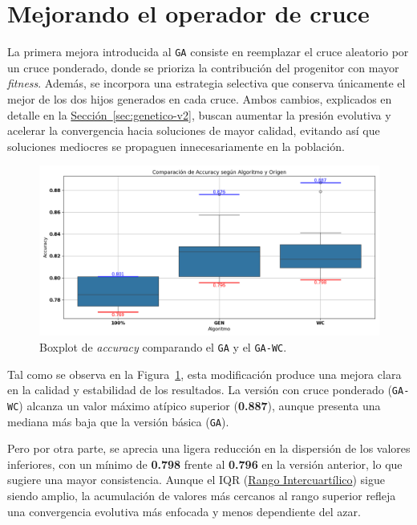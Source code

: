 \section{Mejorando el operador de cruce}\label{sec:incorporacion-cruce}
La primera mejora introducida al \texttt{GA} consiste en reemplazar el cruce aleatorio por un cruce ponderado,
donde se prioriza la contribución del progenitor con mayor \textit{fitness}.
Además, se incorpora una estrategia selectiva que conserva únicamente el mejor de los dos hijos generados en cada cruce.
Ambos cambios, explicados en detalle en la \hyperref[sec:genetico-v2]{Sección~\ref*{sec:genetico-v2}},
buscan aumentar la presión evolutiva y acelerar la convergencia hacia soluciones de mayor calidad,
evitando así que soluciones mediocres se propaguen innecesariamente en la población.

\begin{figure}[htp]
    \centering
    \includegraphics[width=1\textwidth]{imagenes/evaluaciones/operador-de-cruce}
    \caption{Boxplot de \textit{accuracy} comparando el \texttt{GA} y el \texttt{GA-WC}.}
    \label{fig:cruce_ponderado}
\end{figure}

Tal como se observa en la Figura~\ref{fig:cruce_ponderado}, esta modificación produce una mejora clara en la calidad y estabilidad de los resultados.
La versión con cruce ponderado (\texttt{GA-WC}) alcanza un valor máximo atípico superior (\textbf{0.887}),
aunque presenta una mediana más baja que la versión básica (\texttt{GA}).

Pero por otra parte, se aprecia una ligera reducción en la dispersión de los valores inferiores,
con un mínimo de \textbf{0.798} frente al \textbf{0.796} en la versión anterior, lo que sugiere una mayor consistencia.
Aunque el IQR (\hyperref[subsec:visualizacion-de-resultados]{Rango Intercuartílico}) sigue siendo amplio,
la acumulación de valores más cercanos al rango superior refleja una convergencia evolutiva más enfocada y menos dependiente del azar.

